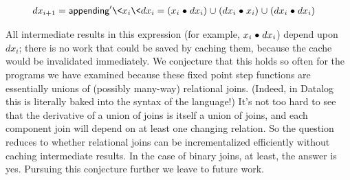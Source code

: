 \begin{align*}
  dx_{i + 1} &= \name{appending}' \<x_i \<dx_i
  = (x_i \relcomp dx_i) \cup (dx_i \relcomp x_i) \cup (dx_i \relcomp dx_i)
\end{align*}

\noindent
All intermediate results in this expression (for example, $x_i \mathrel{\bullet} dx_i$) depend upon $dx_i$; there is no work that could be saved by caching them, because the cache would be invalidated immediately.
%
We conjecture that this holds so often for the programs we have examined because these fixed point step functions are essentially unions of (possibly many-way) relational joins.
%
(Indeed, in Datalog this is literally baked into the syntax of the language!)
%
It's not too hard to see that the derivative of a union of joins is itself a union of joins, and each component join will depend on at least one changing relation.
%
So the question reduces to whether relational joins can be incrementalized efficiently without caching intermediate results.
%
In the case of binary joins, at least, the answer is yes.
%
Pursuing this conjecture further we leave to future work.



